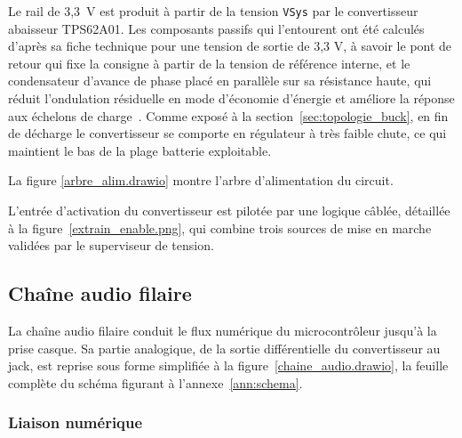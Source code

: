 Le rail de 3,3~V est produit à partir de la tension \texttt{VSys} par le convertisseur abaisseur TPS62A01. Les composants passifs qui l'entourent ont été calculés d'après sa fiche technique pour une tension de sortie de 3,3 V, à savoir le pont de retour qui fixe la consigne à partir de la tension de référence interne, et le condensateur d'avance de phase placé en parallèle sur sa résistance haute, qui réduit l'ondulation résiduelle en mode d'économie d'énergie et améliore la réponse aux échelons de charge~\cite{TI_TPS62A01}. Comme exposé à la section~\ref{sec:topologie_buck}, en fin de décharge le convertisseur se comporte en régulateur à très faible chute, ce qui maintient le bas de la plage batterie exploitable.

La figure \ref{arbre_alim.drawio} montre l'arbre d'alimentation du circuit.


L'entrée d'activation du convertisseur est pilotée par une logique câblée, détaillée à la figure~\ref{extrain_enable.png}, qui combine trois sources de mise en marche validées par le superviseur de tension.



\subsection{Chaîne audio filaire}

La chaîne audio filaire conduit le flux numérique du microcontrôleur jusqu'à la prise casque. Sa partie analogique, de la sortie différentielle du convertisseur au jack, est reprise sous forme simplifiée à la figure~\ref{chaine_audio.drawio}, la feuille complète du schéma figurant à l'annexe~\ref{ann:schema}.


\subsubsection{Liaison numérique}

